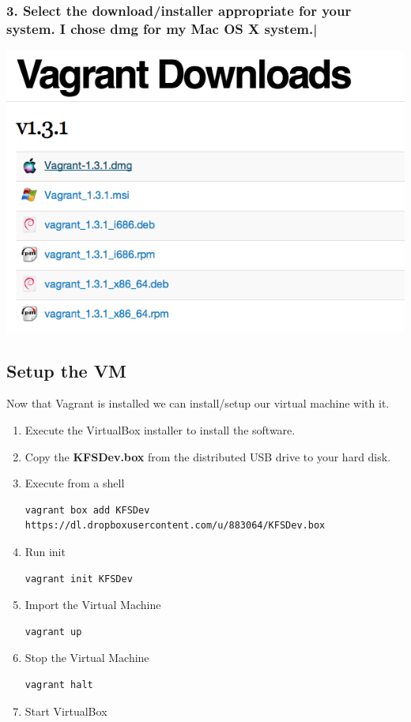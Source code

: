 \documentclass[12pt,notitlepage]{article}
\begin{document}
\subsubsection*{3. Select the download/installer appropriate for your system. I chose dmg for my Mac OS X system.|}
\includegraphics[width=\textwidth]{screenshots/Lesson1_2SS2.png}

\subsection{Setup the VM}
Now that Vagrant is installed we can install/setup our virtual machine with it.
\begin{enumerate}
  \item Execute the VirtualBox installer to install the software.
  \item Copy the \textbf{KFSDev.box} from the distributed USB drive to
    your hard disk.
  \item Execute from a shell 
    \begin{verbatim}
vagrant box add KFSDev https://dl.dropboxusercontent.com/u/883064/KFSDev.box
    \end{verbatim}
  \item Run init
    \begin{verbatim}
vagrant init KFSDev
    \end{verbatim}
  \item Import the Virtual Machine
    \begin{verbatim}
vagrant up
    \end{verbatim}
  \item Stop the Virtual Machine
    \begin{verbatim}
vagrant halt
    \end{verbatim}
  \item Start VirtualBox
\end{enumerate}
\end{document}
